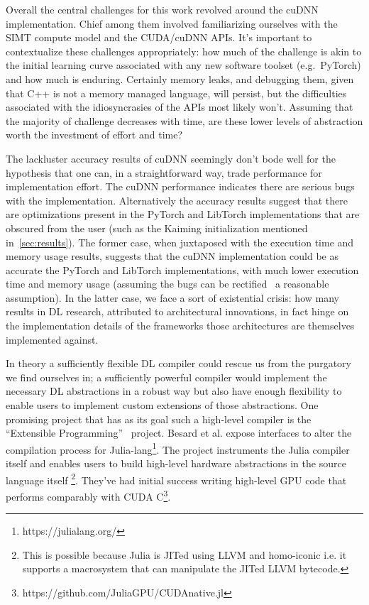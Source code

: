 
Overall the central challenges for this work revolved around the cuDNN implementation.
Chief among them involved familiarizing ourselves with the SIMT compute model and the CUDA/cuDNN APIs.
It's important to contextualize these challenges appropriately: how much of the challenge is akin to the initial learning curve associated with any new software toolset (e.g.\ PyTorch) and how much is enduring.
Certainly memory leaks, and debugging them, given that C++ is not a memory managed language, will persist, but the difficulties associated with the idiosyncrasies of the APIs most likely won't.
Assuming that the majority of challenge decreases with time, are these lower levels of abstraction worth the investment of effort and time?

The lackluster accuracy results of cuDNN seemingly don't bode well for the hypothesis that one can, in a straightforward way, trade performance for implementation effort.
The cuDNN performance indicates there are serious bugs with the implementation.
Alternatively the accuracy results suggest that there are optimizations present in the PyTorch and LibTorch implementations that are obscured from the user (such as the Kaiming initialization mentioned in~\cref{sec:results}).
The former case, when juxtaposed with the execution time and memory usage results, suggests that the cuDNN implementation could be as accurate the PyTorch and LibTorch implementations, with much lower execution time and memory usage (assuming the bugs can be rectified \textemdash\ a reasonable assumption).
In the latter case, we face a sort of existential crisis: how many results in DL research, attributed to architectural innovations, in fact hinge on the implementation details of the frameworks those architectures are themselves implemented against.

In theory a sufficiently flexible DL compiler could rescue us from the purgatory we find ourselves in;
a sufficiently powerful compiler would implement the necessary DL abstractions in a robust way but also have enough flexibility to enable users to implement custom extensions of those abstractions.
One promising project that has as its goal such a high-level compiler is the ``Extensible Programming''~\cite{Besard_2019} project.
Besard et al. expose interfaces to alter the compilation process for Julia-lang\footnote{https://julialang.org/}.
The project instruments the Julia compiler itself and enables users to build high-level hardware abstractions in the source language itself%
\footnote{This is possible because Julia is JITed using LLVM and homo-iconic i.e. it supports a macrosystem that can manipulate the JITed LLVM bytecode.}.
They've had initial success writing high-level GPU code that performs comparably with CUDA C\footnote{https://github.com/JuliaGPU/CUDAnative.jl}.

